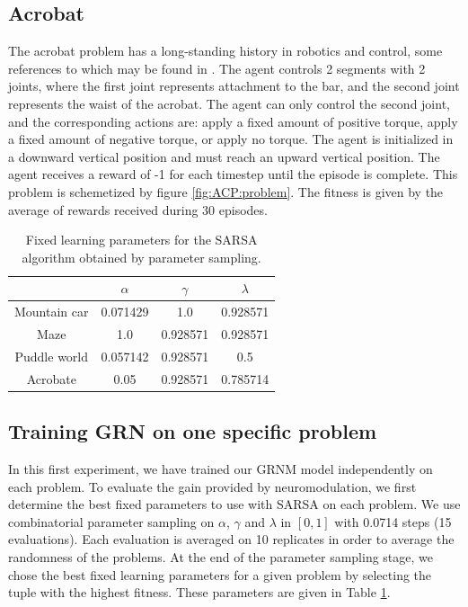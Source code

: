 \subsection{Acrobat}

The acrobat problem has a long-standing history in robotics and control, some references to which may be found in \cite{sutton1998introduction}. The agent controls 2 segments with 2 joints, where the first joint represents attachment to the bar, and the second joint represents the waist of the acrobat. The agent can only control the second joint, and the corresponding actions are: apply a fixed amount of positive torque, apply a fixed amount of negative torque, or apply no torque. The agent is initialized in a downward vertical position and must reach an upward vertical position. The agent receives a reward of -1 for each timestep until the episode is complete. This problem is schemetized by figure \ref{fig:ACP:problem}. The fitness is given by the average of rewards received during 30 episodes.

\begin{table}[b]
\center
\begin{tabular}{|c|ccc|}
\cline{2-4}
\multicolumn{1}{c|}{ }	& $\alpha$	& $\gamma$	& $\lambda$	\\\hline
Mountain car			& 0.071429	& 1.0		& 0.928571 	\\%
Maze				& 1.0		& 0.928571	& 0.928571	\\%
Puddle world			&  0.057142	& 0.928571	& 0.5		\\%
Acrobate				& 0.05		& 0.928571	& 0.785714	\\\hline
\end{tabular}
\caption{Fixed learning parameters for the SARSA algorithm obtained by parameter sampling.}\label{tab:SARSAFixedParams}
\end{table}


\subsection{Training GRN on one specific problem}
In this first experiment, we have trained our GRNM model independently on each problem. To evaluate the gain provided by neuromodulation, we first determine the best fixed parameters to use with SARSA on each problem. We use combinatorial parameter sampling on $\alpha$, $\gamma$ and $\lambda$ in $[0, 1]$ with 0.0714 steps (15 evaluations). Each evaluation is averaged on 10 replicates in order to average the randomness of the problems. At the end of the parameter sampling stage, we chose the best fixed learning parameters for a given problem by selecting the tuple with the highest fitness. These parameters are given in Table \ref{tab:SARSAFixedParams}.

